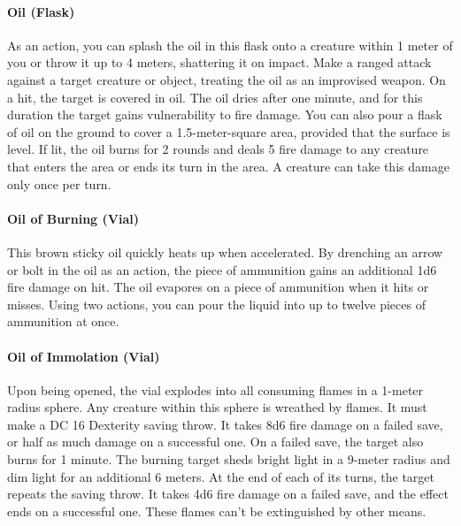     \paragraph{Oil (Flask)}
        As an action, you can splash the oil in this flask onto a creature within 1 meter of you or throw it up to 4 meters, shattering it on impact.
        Make a ranged attack against a target creature or object, treating the oil as an improvised weapon.
        On a hit, the target is covered in oil.
        The oil dries after one minute, and for this duration the target gains vulnerability to fire damage.
        You can also pour a flask of oil on the ground to cover a 1.5-meter-square area, provided that the surface is level.
        If lit, the oil burns for 2 rounds and deals 5 fire damage to any creature that enters the area or ends its turn in the area.
        A creature can take this damage only once per turn.
    \paragraph{Oil of Burning (Vial)} %
        This brown sticky oil quickly heats up when accelerated.
        By drenching an arrow or bolt in the oil as an action, the piece of ammunition gains an additional 1d6 fire damage on hit.
        The oil evapores on a piece of ammunition when it hits or misses.
        Using two actions, you can pour the liquid into up to twelve pieces of ammunition at once.
    \paragraph{Oil of Immolation (Vial)} %
        Upon being opened, the vial explodes into all consuming flames in a 1-meter radius sphere.
        Any creature within this sphere is wreathed by flames.
        It must make a DC 16 Dexterity saving throw.
        It takes 8d6 fire damage on a failed save, or half as much damage on a successful one.
        On a failed save, the target also burns for 1 minute.
        The burning target sheds bright light in a 9-meter radius and dim light for an additional 6 meters.
        At the end of each of its turns, the target repeats the saving throw.
        It takes 4d6 fire damage on a failed save, and the effect ends on a successful one.
        These flames can't be extinguished by other means.

